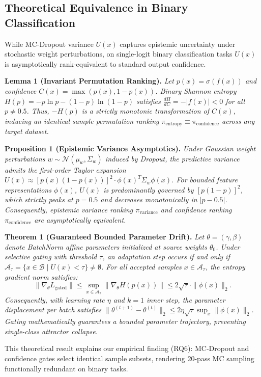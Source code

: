 \documentclass[conference]{IEEEtran}
\begin{document}
\subsection{Theoretical Equivalence in Binary Classification}
\label{sec:theory}
While MC-Dropout variance $U(x)$ captures epistemic uncertainty under stochastic weight perturbations, on single-logit binary classification tasks $U(x)$ is asymptotically rank-equivalent to standard output confidence.

\textbf{Lemma 1 (Invariant Permutation Ranking).} \emph{Let $p(x) = \sigma(f(x))$ and confidence $C(x) = \max(p(x), 1 - p(x))$. Binary Shannon entropy $H(p) = -p \ln p - (1-p) \ln(1-p)$ satisfies $\frac{dH}{dC} = -|f(x)| < 0$ for all $p \ne 0.5$. Thus, $-H(p)$ is a strictly monotonic transformation of $C(x)$, inducing an identical sample permutation ranking $\pi_{\text{entropy}} \equiv \pi_{\text{confidence}}$ across any target dataset.}

\textbf{Proposition 1 (Epistemic Variance Asymptotics).} \emph{Under Gaussian weight perturbations $w \sim \mathcal{N}(\mu_w, \Sigma_w)$ induced by Dropout, the predictive variance admits the first-order Taylor expansion $U(x) \approx [p(x)(1 - p(x))]^2 \cdot \phi(x)^T \Sigma_w \phi(x)$. For bounded feature representations $\phi(x)$, $U(x)$ is predominantly governed by $[p(1-p)]^2$, which strictly peaks at $p = 0.5$ and decreases monotonically in $|p - 0.5|$. Consequently, epistemic variance ranking $\pi_{\text{variance}}$ and confidence ranking $\pi_{\text{confidence}}$ are asymptotically equivalent.}

\textbf{Theorem 1 (Guaranteed Bounded Parameter Drift).} \emph{Let $\theta = (\gamma, \beta)$ denote BatchNorm affine parameters initialized at source weights $\theta_0$. Under selective gating with threshold $\tau$, an adaptation step occurs if and only if $\mathcal{A}_\tau = \{x \in \mathcal{B} \mid U(x) < \tau\} \ne \emptyset$. For all accepted samples $x \in \mathcal{A}_\tau$, the entropy gradient norm satisfies:
\[
\|\nabla_\theta L_{\text{gated}}\| \le \sup_{x \in \mathcal{A}_\tau} \|\nabla_\theta H(p(x))\| \le 2\sqrt{\tau} \cdot \|\phi(x)\|_2.
\]
Consequently, with learning rate $\eta$ and $k=1$ inner step, the parameter displacement per batch satisfies $\|\theta^{(t+1)} - \theta^{(t)}\|_2 \le 2\eta\sqrt{\tau}\sup_x \|\phi(x)\|_2$. Gating mathematically guarantees a bounded parameter trajectory, preventing single-class attractor collapse.}

This theoretical result explains our empirical finding (RQ6): MC-Dropout and confidence gates select identical sample subsets, rendering 20-pass MC sampling functionally redundant on binary tasks.
\end{document}
